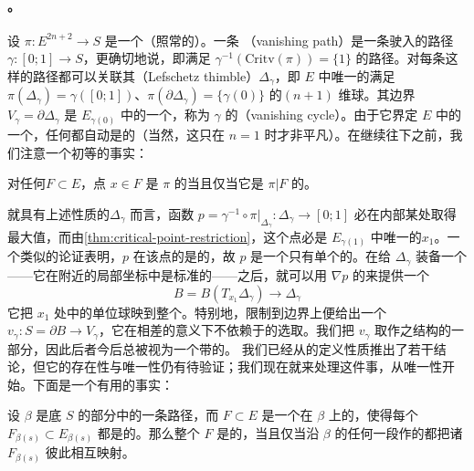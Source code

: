 \paragraph{\trVanishingCycle{}。}\label{sub:vanishing-cycles}
设 $\pi\colon E^{2n+2}\to S$ 是一个（照常\trExact{}的）\trLefschetzFibration。一条%
\textbf{\trVanishingPath}（vanishing path）是一条驶入\trCriticalPoint{}的\trEmbedding{}路径%
$\gamma\colon[0;1]\to S$，更确切地说，即满足 $\gamma^{-1}(\mathrm{Critv}(\pi))=\{1\}$ 的路径。对每条这样的路径都可以关联其\textbf{\trLefschetzThimble}（Lefschetz thimble）$\Delta_\gamma$，即 $E$ 中唯一的满足 $\pi(\Delta_\gamma)=\gamma([0;1])$、$\pi(\partial\Delta_\gamma)=\{\gamma(0)\}$ 的\trEmbedding\trLagrange{}$(n{+}1)$ 维球。其边界 $V_\gamma=\partial\Delta_\gamma$ 是 $E_{\gamma(0)}$ 中的一个\trLagrange\trSphere，称为 $\gamma$ 的\textbf{\trVanishingCycle}（vanishing cycle）。由于它界定 $E$ 中的一个\trLagrange\trDisk{}，任何\trVanishingCycle{}都自动是\trExact{}的（当然，这只在 $n=1$ 时才非平凡）。在继续往下之前，我们注意一个初等的事实：
\begin{lemma}\label{thm:critical-point-restriction}
对任何\trLagrange\trSubmanifold{}$F\subset E$，点 $x\in F$ 是 $\pi$ 的\trCriticalPoint{}当且仅当它是 $\pi|F$ 的\trCriticalPoint{}。
\end{lemma}
\noqed
就具有上述性质的\trDisk{}$\Delta_\gamma$ 而言，函数 $p=\gamma^{-1}\circ\pi|_{\Delta_\gamma}\colon\Delta_\gamma\to[0;1]$ 必在内部某处取得最大值，而由\cref{thm:critical-point-restriction}，这个点必是 $E_{\gamma(1)}$ 中唯一的\trSingularPoint{}$x_1$。一个类似的论证表明，$p$ 在该点的\trHessian{}是\trNondegenerate{}的，故 $p$ 是一个只有单个\trCriticalPoint{}的\trMorseFunction{}。在给 $\Delta_\gamma$ 装备一个\trMetric{}——它在\trCriticalPoint{}附近的局部\trMorse{}坐标中是标准的——之后，就可以用 $\nabla p$ 的\trFlow{}来提供一个\trDiffeomorphism
\begin{equation}\label{eq:thimble-ball-diffeomorphism}
B=B(T_{x_1}\Delta_\gamma)\longrightarrow\Delta_\gamma
\end{equation}
它把 $x_1$ 处\trTangentSpace{}中的单位球映到整个\trLefschetzThimble{}。特别地，限制到边界上便给出一个\trFrame{}$v_\gamma\colon S=\partial B\to V_\gamma$，它在相差\trIsotopy{}的意义下不依赖于\trMetric{}的选取。我们把 $v_\gamma$ 取作\trVanishingCycle{}之结构的一部分，因此后者今后总被视为一个带\trFrame{}的\trExact\trLagrange\trSphere。
我们已经从\trLefschetzThimble{}的定义性质推出了若干结论，但它的存在性与唯一性仍有待验证；我们现在就来处理这件事，从唯一性开始。下面是一个有用的事实：
\begin{lemma}\label{thm:fibered-lagrangian-criterion}
设 $\beta$ 是底 $S$ 的\trRegular{}部分中的一条\trEmbedding{}路径，而 $F\subset E$ 是一个在 $\beta$ 上\trFibration{}的\trSubmanifold{}，使得每个 $F_{\beta(s)}\subset E_{\beta(s)}$ 都是\trLagrange{}的。那么整个 $F$ 是\trLagrange{}的，当且仅当沿 $\beta$ 的任何一段作的\trParallelTransport{}都把诸 $F_{\beta(s)}$ 彼此相互映射。
\end{lemma}
